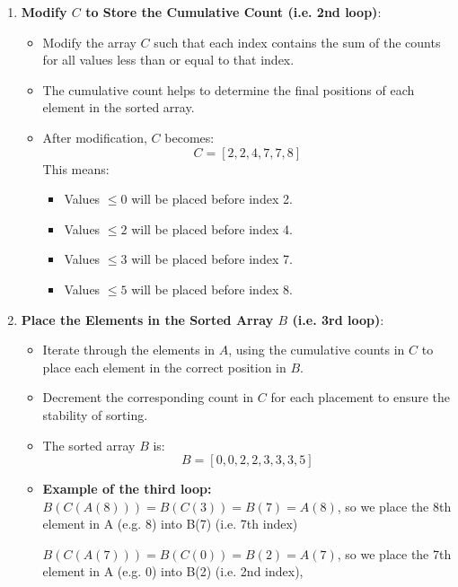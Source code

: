\begin{example}
\begin{enumerate}
        \item \textbf{Modify \( C \) to Store the Cumulative Count (i.e. 2nd loop)}:
        \begin{itemize}
            \item Modify the array \( C \) such that each index contains the sum of the counts for all values less than or equal to that index.
            \item The cumulative count helps to determine the final positions of each element in the sorted array.
            \item After modification, \( C \) becomes:
            \[
            C = [2, 2, 4, 7, 7, 8]
            \]
            This means:
            \begin{itemize}
                \item Values \( \leq 0 \) will be placed before index 2.
                \item Values \( \leq 2 \) will be placed before index 4.
                \item Values \( \leq 3 \) will be placed before index 7.
                \item Values \( \leq 5 \) will be placed before index 8.
            \end{itemize}
        \end{itemize}
        
        \item \textbf{Place the Elements in the Sorted Array \( B \) (i.e. 3rd loop)}:
        \begin{itemize}
            \item Iterate through the elements in \( A \), using the cumulative counts in \( C \) to place each element in the correct position in \( B \).
            \item Decrement the corresponding count in \( C \) for each placement to ensure the stability of sorting.
            \item The sorted array \( B \) is:
            \[
            B = [0, 0, 2, 2, 3, 3, 3, 5]
            \]
            \item \textbf{Example of the third loop:} $B(C(A(8)))=B(C(3))=B(7)=A(8)$, so we place the 8th element in A (e.g. 8) into B(7) (i.e. 7th index)
            \vspace{1em}

            $B(C(A(7)))=B(C(0))=B(2)=A(7)$, so we place the 7th element in A (e.g. 0) into B(2) (i.e. 2nd index), 
        \end{itemize}
    \end{enumerate}
\end{example}

